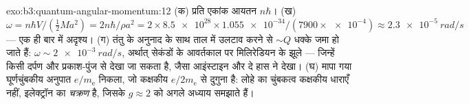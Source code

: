\begin{solution}{exo:b3:quantum-angular-momentum:12}
(क) प्रति एकांक आयतन $n\hbar$। (ख) $\omega = n\hbar V/(\tfrac12 Ma^2)
= 2n\hbar/\rho a^2 = 2 \times \num{8.5e28} \times \num{1.055e-34}/
(7900 \times \num{e-4}) \approx \qty{2.3e-5}{rad/s}$ --- एक ही बार में
अदृश्य। (ग) तंतु के अनुनाद के साथ ताल में उलटाव करने से
$\sim Q$ धक्के जमा हो जाते हैं: $\omega \sim \qty{2e-3}{rad/s}$,
अर्थात् सेकंडों के आवर्तकाल पर मिलिरेडियन के झूले --- जिन्हें किसी
दर्पण और प्रकाश-पुंज से देखा जा सकता है, जैसा आइंस्टाइन और दे हास ने
देखा। (घ) मापा गया घूर्णचुंबकीय अनुपात $e/m_{\text{e}}$ निकला, जो
कक्षकीय $e/2m_{\text{e}}$ से दुगुना है: लोहे का चुंबकत्व कक्षकीय
धाराएँ नहीं, इलेक्ट्रॉन का \emph{चक्रण} है, जिसके $g \approx 2$ को
अगले अध्याय समझाते हैं।
\end{solution}

